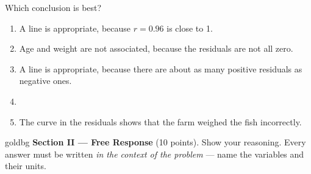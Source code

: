 \documentclass[12pt]{article}
\begin{document}
\begin{enumerate}[leftmargin=1.9em, itemsep=0.13in]
        Which conclusion is best?
        \begin{enumerate}[label=\textbf{(\Alph*)}, leftmargin=2.2em, itemsep=2pt]
          \item A line is appropriate, because $r = 0.96$ is close to 1.\hfill{}\rule[-0.2in]{0pt}{0.48in}
          \item Age and weight are not associated, because the residuals are not all zero.
          \item A line is appropriate, because there are about as many positive residuals as
                negative ones.
          \item {}
          \item The curve in the residuals shows that the farm weighed the fish incorrectly.
        \end{enumerate}

\end{enumerate}

\vspace{0.14in}

\boxguard[26]
\begin{headlinebox}{goldbg}
\small
\textbf{Section II --- Free Response} (10 points). Show your reasoning. Every answer must be
written \emph{in the context of the problem} --- name the variables and their units.
\end{headlinebox}

\vspace{0.10in}
\end{document}
